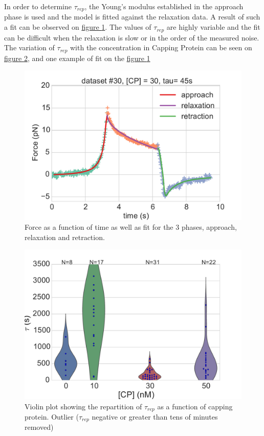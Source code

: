\documentclass[A4paperpaper,11pt,english]{sphinxmanual}
\begin{document}
In order to determine \(\tau_{rep}\), the Young's modulus established  in the
approach phase is used and the model is fitted against the relaxation data.  A
result of such a fit can be observed on \hyperref[index-latex:fit-3-phases]{figure  \ref*{index-latex:fit-3-phases}}. The values of
\(\tau_{rep}\) are highly variable and the fit can be difficult when the relaxation is
slow or in the order of the measured noise. The variation of \(\tau_{rep}\) with the
concentration in Capping Protein can be seen on \hyperref[index-latex:tau-violin]{figure  \ref*{index-latex:tau-violin}}, and
one example of fit on the \hyperref[index-latex:fit-3-phases]{figure  \ref*{index-latex:fit-3-phases}}
\begin{figure}[htbp]
\centering
\capstart

\includegraphics[width=0.800\linewidth]{3phases.pdf}
\caption{Force as a function of time as well as fit for the 3 phases, approach,
relaxation and retraction.}\label{index-latex:fit-3-phases}\end{figure}
\begin{figure}[htbp]
\centering
\capstart

\includegraphics[width=0.800\linewidth]{tau_violin.pdf}
\caption{Violin plot showing the repartition of \(\tau_{rep}\) as a function of capping
protein. Outlier (\(\tau_{rep}\) negative or greater than tens of minutes removed)}\label{index-latex:tau-violin}\end{figure}
\end{document}
